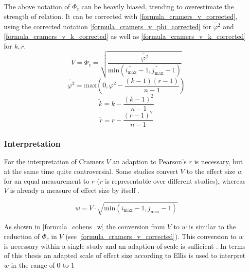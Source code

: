 \smallskip

The above notation of $\Phi_c$ can be heavily biased, trending to overestimate the strength of relation. It can be corrected with \cref{formula_cramers_v_corrected}, using the corrected notation \cref{formula_cramers_v_phi_corrected} for $\tilde{\varphi^2}$ and \cref{formula_cramers_v_k_corrected} as well as \cref{formula_cramers_v_k_corrected} for $k,r$. \parencite{Bergsma2013}
\smallskip
\begin{equation}
\label{formula_cramers_v_corrected}
	\tilde{V} = \tilde{\Phi_c} = \sqrt{\frac{\tilde{\varphi^2}}{\text{min}(\tilde{i_{\text{max}}}-1,\tilde{j_{\text{max}}}-1)}}
\end{equation}
\begin{equation}
\label{formula_cramers_v_phi_corrected}
	\tilde{\varphi^2} = \text{max}\left(0,\varphi^2 - \frac{(k-1)(r-1)}{n-1}\right)
\end{equation}
\begin{equation}
\label{formula_cramers_v_k_corrected}
	\tilde{k} = k - \frac{(k-1)^2}{n-1}
\end{equation}
\begin{equation}
\label{formula_cramers_v_r_corrected}
	\tilde{r} = r - \frac{(r-1)^2}{n-1}
\end{equation}

\bigskip

\subsubsection{Interpretation}
For the interpretation of Cramers $V$ an adaption to Pearson's $r$ is necessary, but at the same time quite controversial. Some studies convert $V$ to the effect size $w$ for an equal measurement to $r$ ($r$ is representable over different studies), whereas $V$ is already a measure of effect size by itself \parencite{Baguley2016}.

\smallskip
\begin{equation}
\label{formula_cohens_w}
	w = V \cdot \sqrt{\text{min}(i_{\text{max}}-1,j_{\text{max}}-1)}
\end{equation}

\medskip

As shown in \cref{formula_cohens_w} \parencite{Baguley2016} the conversion from $V$ to $w$ is similar to the reduction of $\Phi_c$ in $V$ (see \cref{formula_cramers_v_corrected}). This conversion to $w$ is necessary within a single study and an adaption of scale is sufficient \parencite{Baguley2016}. In terms of this thesis an adapted scale of effect size according to Ellis is used to interpret $w$ in the range of $0$ to $1$ \parencite{Cohen1988,Ellis2010,Hemmerich2019}

